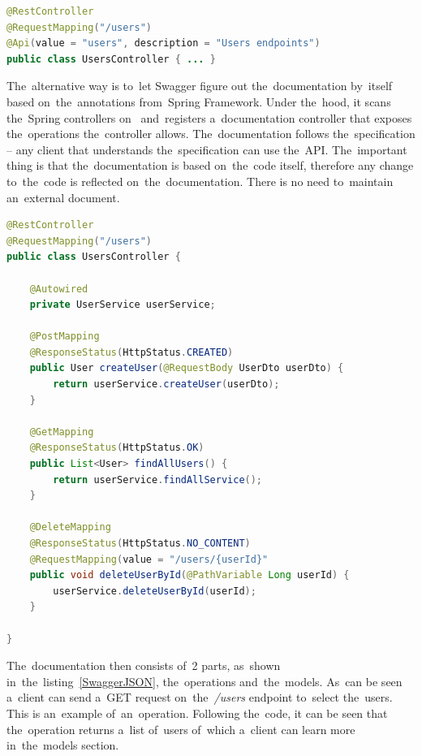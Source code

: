 \vspace{2mm}
\begin{lstlisting}[caption=An~example of~Swagger's internal annotation that can
be used to~generate documentation., language=Java,
label=SwaggerAnnotation]
@RestController
@RequestMapping("/users")
@Api(value = "users", description = "Users endpoints")
public class UsersController { ... }
\end{lstlisting}

The~alternative way is to~let Swagger figure out the~documentation by~itself
based on~the~annotations from~Spring Framework. Under the~hood, it scans
the~Spring controllers on~ and~registers a~documentation controller that exposes the~operations
the~controller allows. The~documentation follows the~specification -- any client
that understands the~specification can use the~API. The~important thing is that
the~documentation is based on~the~code itself, therefore any change to~the~code
is reflected on~the~documentation. There is no need to~maintain an~external
document. 

\vspace{2mm}
\begin{lstlisting}[caption=An~example of~Spring MVC controller that can be used
by~Swagger to~generate API documentation., language=Java,
label=SpringController]
@RestController
@RequestMapping("/users")
public class UsersController {
	
	@Autowired
	private UserService userService;
	
	@PostMapping
	@ResponseStatus(HttpStatus.CREATED)
	public User createUser(@RequestBody UserDto userDto) {
		return userService.createUser(userDto);
	}
	
	@GetMapping
	@ResponseStatus(HttpStatus.OK)
	public List<User> findAllUsers() {
		return userService.findAllService();
	}
	
	@DeleteMapping
	@ResponseStatus(HttpStatus.NO_CONTENT)
	@RequestMapping(value = "/users/{userId}"
	public void deleteUserById(@PathVariable Long userId) {
		userService.deleteUserById(userId);
	}
	
}
\end{lstlisting}

The~documentation then consists of~2 parts, as~shown
in~the~listing~\ref{SwaggerJSON}, the~operations and~the~models. As~can be 
seen a~client can send a~GET request on~the~\textit{/users} endpoint
to~select the~users. This is an~example of~an~operation. Following the~code,
it can be seen that the~operation returns a~list of~users of~which a~client can
learn more in~the~models section.

